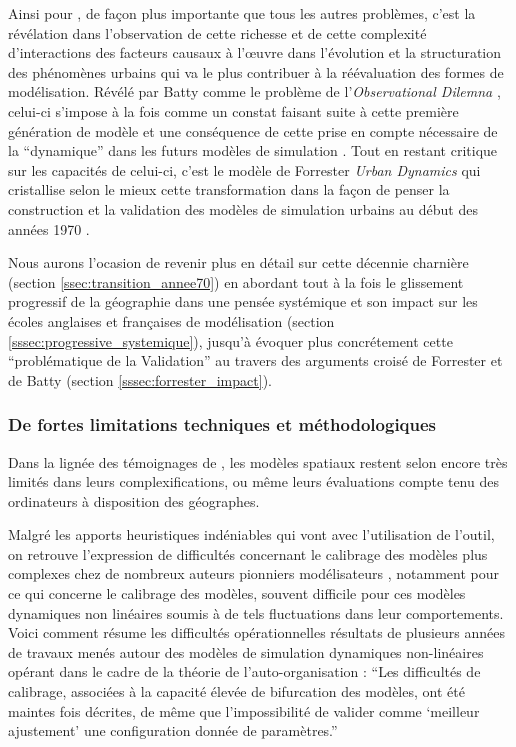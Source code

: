 Ainsi pour \textcite[11]{Batty1976}, de façon plus importante que tous les autres problèmes, c'est la révélation dans l'observation de cette richesse et de cette complexité d'interactions des facteurs causaux à l’œuvre dans l'évolution et la structuration des phénomènes urbains qui va le plus contribuer à la réévaluation des formes de modélisation. Révélé par Batty comme le problème de l'\textit{Observational Dilemna} \autocite[11,296]{Batty1976} , celui-ci s'impose à la fois comme un constat faisant suite à cette première génération de modèle  et une conséquence de cette prise en compte nécessaire de la \enquote{dynamique} dans les futurs modèles de simulation . Tout en restant critique sur les capacités de celui-ci, c'est le modèle de Forrester \textit{Urban Dynamics} \autocite{Forrester1969} qui cristallise selon \textcites{Batty2001, Batty2005b} le mieux cette transformation dans la façon de penser la construction et la validation des modèles de simulation urbains au début des années 1970 . 

Nous aurons l'ocasion de revenir plus en détail sur cette décennie charnière (section \ref{ssec:transition_annee70}) en abordant tout à la fois le glissement progressif de la géographie dans une pensée systémique et son impact sur les écoles anglaises et françaises de modélisation (section \ref{sssec:progressive_systemique}), jusqu'à évoquer plus concrétement cette \enquote{problématique de la Validation} au travers des arguments croisé de Forrester et de Batty (section \ref{sssec:forrester_impact}).

\subsubsection{De fortes limitations techniques et méthodologiques}
\label{ssec:limitation_techniques_methodologiques}

Dans la lignée des témoignages de \textcite{Marble1972} , les modèles spatiaux restent selon \textcite{Batty1976}  encore très limités dans leurs complexifications, ou même leurs évaluations compte tenu des ordinateurs à disposition des géographes. 

Malgré les apports heuristiques indéniables qui vont avec l'utilisation de l'outil, on retrouve l'expression de difficultés concernant le calibrage des modèles plus complexes chez de nombreux auteurs pionniers modélisateurs \autocites{Batty1976,Pumain1983b}[400]{Sanders1984}, notamment pour ce qui concerne le calibrage des modèles, souvent difficile pour ces modèles dynamiques non linéaires soumis à de tels fluctuations dans leur comportements. Voici comment \autocite{Pumain1998a} résume les difficultés opérationnelles résultats de plusieurs années de travaux menés autour des modèles de simulation dynamiques non-linéaires opérant dans le cadre de la théorie de l'auto-organisation : \enquote{Les difficultés de calibrage, associées à la capacité élevée de bifurcation des modèles, ont été maintes fois décrites, de même que l’impossibilité de valider comme \enquote{meilleur ajustement} une configuration donnée de paramètres.}

